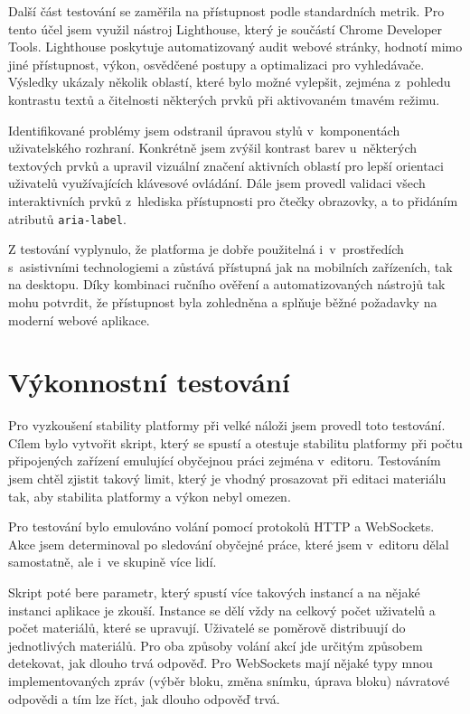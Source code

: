 Další část testování se zaměřila na přístupnost podle standardních metrik. 
Pro tento účel jsem využil nástroj Lighthouse, který je součástí Chrome Developer Tools. 
Lighthouse poskytuje automatizovaný audit webové stránky, hodnotí mimo jiné přístupnost, výkon, osvědčené postupy a optimalizaci pro vyhledávače. 
Výsledky ukázaly několik oblastí, které bylo možné vylepšit, zejména z~pohledu kontrastu textů a čitelnosti některých prvků při aktivovaném tmavém režimu.

Identifikované problémy jsem odstranil úpravou stylů v~komponentách uživatelského rozhraní. 
Konkrétně jsem zvýšil kontrast barev u~některých textových prvků a upravil vizuální značení aktivních oblastí pro lepší orientaci uživatelů využívajících klávesové ovládání.
Dále jsem provedl validaci všech interaktivních prvků z~hlediska přístupnosti pro čtečky obrazovky, a to přidáním atributů \texttt{aria-label}.

Z testování vyplynulo, že platforma je dobře použitelná i~v~prostředích s~asistivními technologiemi a zůstává přístupná jak na mobilních zařízeních, tak na desktopu.
Díky kombinaci ručního ověření a automatizovaných nástrojů tak mohu potvrdit, že přístupnost byla zohledněna a splňuje běžné požadavky na moderní webové aplikace.

\section{Výkonnostní testování}\label{text:testovani/vykon}

Pro vyzkoušení stability platformy při velké náloži jsem provedl toto testování.
Cílem bylo vytvořit skript, který se spustí a otestuje stabilitu platformy při počtu připojených zařízení emulující obyčejnou práci zejména v~editoru.
Testováním jsem chtěl zjistit takový limit, který je vhodný prosazovat při editaci materiálu tak, aby stabilita platformy a výkon nebyl omezen.

Pro testování bylo emulováno volání pomocí protokolů HTTP a WebSockets.
Akce jsem determinoval po sledování obyčejné práce, které jsem v~editoru dělal samostatně, ale i~ve skupině více lidí.

Skript poté bere parametr, který spustí více takových instancí a na nějaké instanci aplikace je zkouší.
Instance se dělí vždy na celkový počet uživatelů a počet materiálů, které se upravují.
Uživatelé se poměrově distribuují do jednotlivých materiálů.
Pro oba způsoby volání akcí jde určitým způsobem detekovat, jak dlouho trvá odpověď.
Pro WebSockets mají nějaké typy mnou implementovaných zpráv (výběr bloku, změna snímku, úprava bloku) návratové odpovědi a tím lze říct, jak dlouho odpověď trvá.

